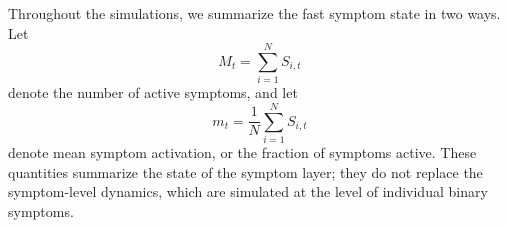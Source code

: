 %


%


Throughout the simulations, we summarize the fast symptom state in two ways.
Let
\[
M_t=\sum_{i=1}^{N}S_{i,t}
\]
denote the number of active symptoms, and let
\[
m_t=\frac{1}{N}\sum_{i=1}^{N}S_{i,t}
\]
denote mean symptom activation, or the fraction of symptoms active. These
quantities summarize the state of the symptom layer; they do not replace the
symptom-level dynamics, which are simulated at the level of individual binary
symptoms.

